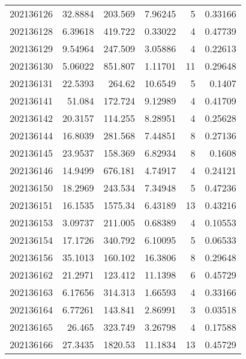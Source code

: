 \begin{tabular}{rrrrrr}
 202136126 &         32.8884  &      203.569  &            7.96245 &           5 & 0.33166 \\
 202136128 &          6.39618 &      419.722  &            0.33022 &           4 & 0.47739 \\
 202136129 &          9.54964 &      247.509  &            3.05886 &           4 & 0.22613 \\
 202136130 &          5.06022 &      851.807  &            1.11701 &          11 & 0.29648 \\
 202136131 &         22.5393  &      264.62   &           10.6549  &           5 & 0.1407  \\
 202136141 &         51.084   &      172.724  &            9.12989 &           4 & 0.41709 \\
 202136142 &         20.3157  &      114.255  &            8.28951 &           4 & 0.25628 \\
 202136144 &         16.8039  &      281.568  &            7.44851 &           8 & 0.27136 \\
 202136145 &         23.9537  &      158.369  &            6.82934 &           8 & 0.1608  \\
 202136146 &         14.9499  &      676.181  &            4.74917 &           4 & 0.24121 \\
 202136150 &         18.2969  &      243.534  &            7.34948 &           5 & 0.47236 \\
 202136151 &         16.1535  &     1575.34   &            6.43189 &          13 & 0.43216 \\
 202136153 &          3.09737 &      211.005  &            0.68389 &           4 & 0.10553 \\
 202136154 &         17.1726  &      340.792  &            6.10095 &           5 & 0.06533 \\
 202136156 &         35.1013  &      160.102  &           16.3806  &           8 & 0.29648 \\
 202136162 &         21.2971  &      123.412  &           11.1398  &           6 & 0.45729 \\
 202136163 &          6.17656 &      314.313  &            1.66593 &           4 & 0.33166 \\
 202136164 &          6.77261 &      143.841  &            2.86991 &           3 & 0.03518 \\
 202136165 &         26.465   &      323.749  &            3.26798 &           4 & 0.17588 \\
 202136166 &         27.3435  &     1820.53   &           11.1834  &          13 & 0.45729 \\

\end{tabular}
